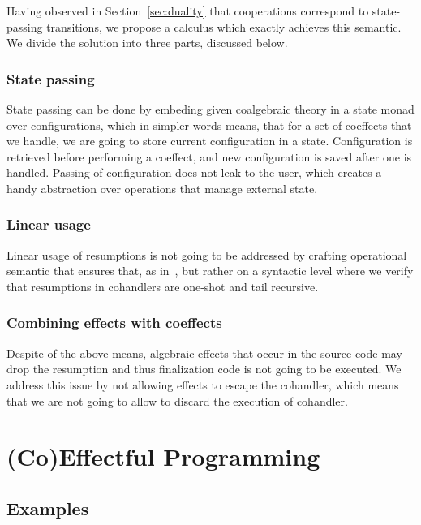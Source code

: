 \documentclass[declaration,shortabstract]{iithesis}
\theoremstyle{definition} \newtheorem{definition}{Definition}[chapter]
\theoremstyle{remark} \newtheorem{remark}[definition]{Observation}
\theoremstyle{plain} \newtheorem{theorem}[definition]{Theorem}
\theoremstyle{plain} \newtheorem{lemma}[definition]{Lemma}
\begin{document}

Having observed in Section~\ref{sec:duality} that cooperations correspond to
state-passing transitions, we propose a calculus which exactly achieves this
semantic. We divide the solution into three parts, discussed below.

\subsection{State passing}

State passing can be done by embeding given coalgebraic theory in a state monad
over configurations, which in simpler words means, that for a set of coeffects
that we handle, we are going to store current configuration in a state.
Configuration is retrieved before performing a coeffect, and new configuration
is saved after one is handled. Passing of configuration does not leak to the
user, which creates a handy abstraction over operations that manage external
state.

\subsection{Linear usage}

Linear usage of resumptions is not going to be addressed by crafting operational
semantic that ensures that, as in~\cite{runners-in-action}, but rather on a
syntactic level where we verify that resumptions in cohandlers are one-shot and
tail recursive.

\subsection{Combining effects with coeffects}

Despite of the above means, algebraic effects that occur in the source code may
drop the resumption and thus finalization code is not going to be executed.
We address this issue by not allowing effects to escape the cohandler, which
means that we are not going to allow to discard the execution of cohandler.


\chapter{(Co)Effectful Programming}\label{chapter:co-effectful-programming}
\section{Examples}\label{sec:examples}
\end{document}
